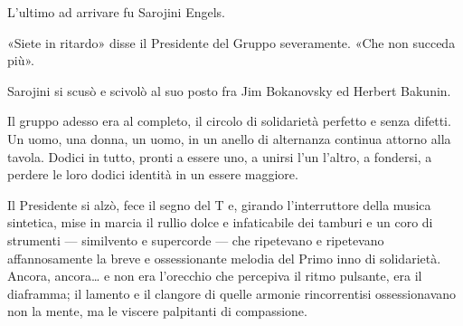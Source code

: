\documentclass[
a5paper, %
10pt, %
twoside, 
onecolumn, %
openany, %
]{memoir}
\begin{document}
L’ultimo ad arrivare fu Sarojini Engels.

«Siete in ritardo» disse il Presidente del Gruppo severamente. «Che non succeda più».

Sarojini si scusò e scivolò al suo posto fra Jim Bokanovsky ed Herbert Bakunin.

Il gruppo adesso era al completo, il circolo di solidarietà perfetto e senza difetti. Un uomo, una donna, un uomo, in un anello di alternanza continua attorno alla tavola. Dodici in tutto, pronti a essere uno, a unirsi l’un l’altro, a fondersi, a perdere le loro dodici identità in un essere maggiore.

Il Presidente si alzò, fece il segno del T e, girando l’interruttore della musica sintetica, mise in marcia il rullio dolce e infaticabile dei tamburi e un coro di strumenti — similvento e supercorde — che ripetevano e ripetevano affannosamente la breve e ossessionante melodia del Primo inno di solidarietà. Ancora, ancora… e non era l’orecchio che percepiva il ritmo pulsante, era il diaframma; il lamento e il clangore di quelle armonie rincorrentisi ossessionavano non la mente, ma le viscere palpitanti di compassione.
\end{document}
